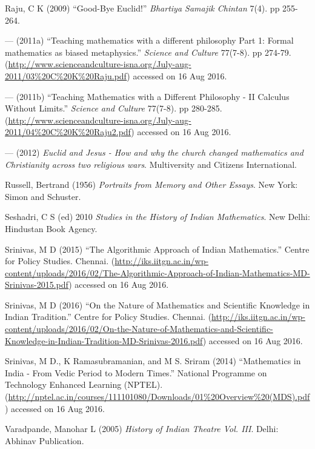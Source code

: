 \begin{thebibliography}{99}
Raju, C K (2009) ``Good-Bye Euclid!'' {\sl Bhartiya Samajik Chintan} 7(4). pp 255-264.

--- (2011a) ``Teaching mathematics with a different philosophy Part 1: Formal mathematics as biased metaphysics.'' {\sl Science and Culture} 77(7-8). pp 274-79. 
(\url{http://www.scienceandculture-isna.org/July-aug-2011/03%20C%20K%20Raju.pdf}) 
accessed on 16 Aug 2016.

--- (2011b) ``Teaching Mathematics with a Different Philosophy - II Calculus Without Limits.'' {\sl Science and Culture} 77(7-8). pp 280-285. 
(\url{http://www.scienceandculture-isna.org/July-aug-2011/04%20C%20K%20Raju2.pdf}) 
accessed on 16 Aug 2016.

--- (2012) {\sl Euclid and Jesus - How and why the church changed mathematics and Christianity across two religious wars}. Multiversity and Citizens International.

Russell, Bertrand (1956) {\sl Portraits from Memory and Other Essays}. New York: Simon and Schuster.

Seshadri, C S (ed) 2010 {\sl Studies in the History of Indian Mathematics}. New Delhi: Hindustan Book Agency.

Srinivas, M D (2015) ``The Algorithmic Approach of Indian Mathematics.'' Centre for Policy Studies. Chennai. (\url{http://iks.iitgn.ac.in/wp-content/uploads/2016/02/The-Algorithmic-Approach-of-Indian-Mathematics-MD-Srinivas-2015.pdf}) accessed on 16 Aug 2016.

Srinivas, M D (2016) ``On the Nature of Mathematics and Scientific Knowledge in Indian Tradition.'' Centre for Policy Studies. Chennai. (\url{http://iks.iitgn.ac.in/wp-content/uploads/2016/02/On-the-Nature-of-Mathematics-and-Scientific-Knowledge-in-Indian-Tradition-MD-Srinivas-2016.pdf}) accessed on 16 Aug 2016.

Srinivas, M D., K Ramasubramanian, and M S. Sriram (2014) ``Mathematics in India - From Vedic Period to Modern Times.'' National Programme on Technology Enhanced Learning (NPTEL). 
(\url{http://nptel.ac.in/courses/111101080/Downloads/01%20Overview%20(MDS).pdf}) 
accessed on 16 Aug 2016.

Varadpande, Manohar L (2005) {\sl History of Indian Theatre Vol. III}. Delhi: Abhinav Publication.
\end{thebibliography}

\theendnotes
\label{chapter\thechapter:end}
